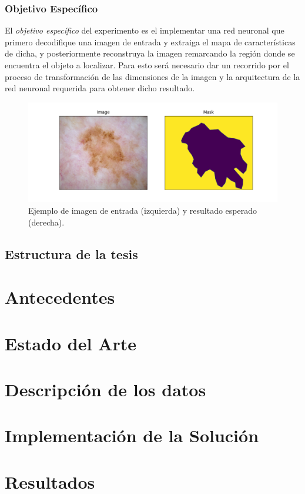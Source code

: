 \subsection{Objetivo Específico}
El \emph{objetivo específico} del experimento es el implementar una red neuronal que primero decodifique una imagen de entrada y extraiga el mapa de características de dicha, y posteriormente reconstruya la imagen remarcando la región donde se encuentra el objeto a localizar. Para esto será necesario dar un recorrido por el proceso de transformación de las dimensiones de la imagen y la arquitectura de la red neuronal requerida para obtener dicho resultado.

\begin{figure}
    \includegraphics[width=150mm]{Figuras/plot_masks.png}
    \centering
    \caption{Ejemplo de imagen de entrada (izquierda) y resultado esperado (derecha).}
\end{figure}

\section{Estructura de la tesis}

\chapter{Antecedentes}

\chapter{Estado del Arte}

\chapter{Descripción de los datos}

\chapter{Implementación de la Solución}

\chapter{Resultados}


